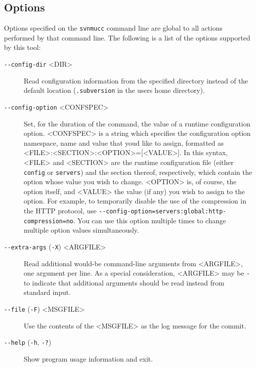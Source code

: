 \subsection{Options}\label{svn.ref.svnmucc.re.sw}

Options specified on the \texttt{svnmucc} command line are global to all
actions performed by that command line. The following is a list of the
options supported by this tool:

\begin{description}
\item[\texttt{-\/-config-dir} \textless DIR\textgreater{}]
Read configuration information from the specified directory instead of
the default location (\texttt{.subversion} in the user\textquotesingle s
home directory).
\item[\texttt{-\/-config-option} \textless CONFSPEC\textgreater{}]
Set, for the duration of the command, the value of a runtime
configuration option. \textless CONFSPEC\textgreater{} is a string which
specifies the configuration option namespace, name and value that
you\textquotesingle d like to assign, formatted as
\textless FILE\textgreater:\textless SECTION\textgreater:\textless OPTION\textgreater={[}\textless VALUE\textgreater{]}.
In this syntax, \textless FILE\textgreater{} and
\textless SECTION\textgreater{} are the runtime configuration file
(either \texttt{config} or \texttt{servers}) and the section thereof,
respectively, which contain the option whose value you wish to change.
\textless OPTION\textgreater{} is, of course, the option itself, and
\textless VALUE\textgreater{} the value (if any) you wish to assign to
the option. For example, to temporarily disable the use of the
compression in the HTTP protocol, use
\texttt{-\/-config-option=servers:global:http-compression=no}. You can
use this option multiple times to change multiple option values
simultaneously.
\item[\texttt{-\/-extra-args} (\texttt{-X})
\textless ARGFILE\textgreater{}]
Read additional would-be command-line arguments from
\textless ARGFILE\textgreater, one argument per line. As a special
consideration, \textless ARGFILE\textgreater{} may be \texttt{-} to
indicate that additional arguments should be read instead from standard
input.
\item[\texttt{-\/-file} (\texttt{-F}) \textless MSGFILE\textgreater{}]
Use the contents of the \textless MSGFILE\textgreater{} as the log
message for the commit.
\item[\texttt{-\/-help} (\texttt{-h}, \texttt{-?})]
Show program usage information and exit.

\end{description}
